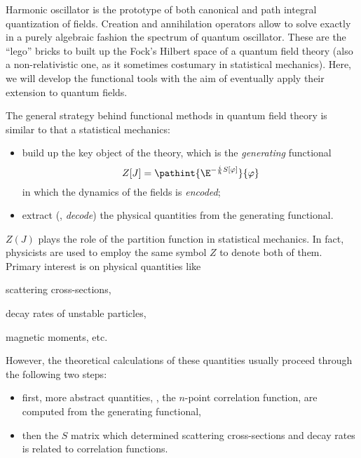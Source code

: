


Harmonic oscillator is the prototype of both canonical and path integral
quantization of fields.
Creation and annihilation operators allow to solve exactly in a purely
algebraic fashion the spectrum of quantum oscillator.
These are the ``lego'' bricks to built up the
Fock's Hilbert space of a quantum field theory (also a non-relativistic one, as
it sometimes costumary in statistical mechanics).
Here, we will develop the functional tools with the aim of eventually apply
their extension to quantum fields.





The general strategy behind functional methods in quantum field theory is
similar to that a statistical mechanics:
\begin{itemize}
   \item build up the key object of the theory, which is the \emph{generating}
      functional
      \begin{dmath}
	 Z[J]  = \pathint{ \E^{ - \frac{i}{\hslash} S[\varphi]}}{\varphi}
      \end{dmath}
      in which the dynamics of the fields is \emph{encoded};
   \item extract (\ie, \emph{decode}) the physical quantities from the
      generating 
      functional.
\end{itemize}
$Z(J)$ plays the role of the partition function in statistical mechanics.
In fact, physicists are used to employ the same symbol $Z$ to denote
both of them.
Primary interest is on physical quantities like
\begin{inparaenum}[a)]
   \item scattering cross-sections,
   \item decay rates of unstable particles,
   \item magnetic moments, etc.
\end{inparaenum}
However, the theoretical calculations of these quantities usually proceed
through  the following
two steps:
\begin{itemize}
   \item first, more abstract quantities, \ie, the $n$-point correlation
      function, are computed from the generating functional,
   \item then the $S$ matrix which determined scattering cross-sections and
      decay rates is related to correlation functions.
\end{itemize}





